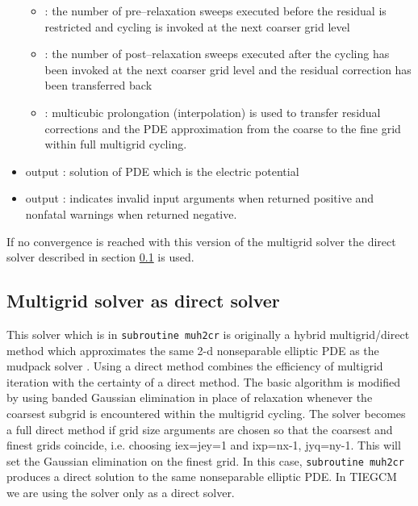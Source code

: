 \begin{itemize}
\begin{itemize}
         \item {}: the number of pre--relaxation 
	   sweeps executed before the
           residual is restricted and cycling is invoked at the next
           coarser grid level
         \item {}: the number of post--relaxation sweeps executed after the cycling
           has been invoked at the next coarser grid level and the residual
           correction has been transferred back
         \item {}: multicubic prolongation 
	      (interpolation) is used to
              transfer residual corrections and the PDE approximation
              from the coarse to the fine grid within full multigrid cycling.
     \end{itemize}
  \item output \flags{$\Phi$}: solution of PDE which is the electric potential
  \item output : indicates invalid input arguments when
          returned positive and nonfatal warnings when returned
          negative.
%
\end{itemize}
%
If no convergence is reached with this version of the multigrid solver the direct
solver described in section \ref{cap:directsol} is used.
%
\subsection{Multigrid solver  as direct solver}\label{cap:directsol}
%
This solver which is in \texttt{subroutine muh2cr} is originally a hybrid 
multigrid/direct method which approximates the
same 2-d nonseparable elliptic PDE as the mudpack solver .
Using a direct method combines the efficiency of multigrid iteration 
with the certainty of
a direct method.  The basic algorithm is modified by using banded
Gaussian elimination in place of relaxation whenever the coarsest
subgrid is encountered within the multigrid cycling.
The solver becomes a full direct method if grid size arguments are chosen
so that the coarsest and finest grids coincide, i.e.  choosing iex=jey=1
and ixp=nx-1, jyq=ny-1. This will set the Gaussian elimination
on the finest grid.  In this case, \texttt{subroutine muh2cr} produces a 
direct solution
to the same nonseparable elliptic PDE. In TIEGCM we are using the
solver  only as a direct solver.
%
